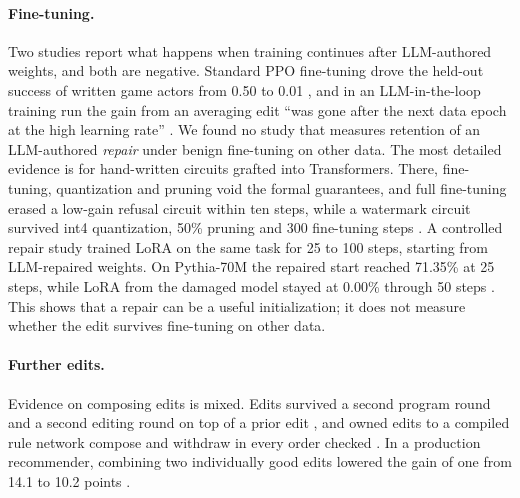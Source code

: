 \paragraph{Fine-tuning.} Two studies report what happens when training continues after LLM-authored weights, and both are negative. Standard PPO fine-tuning drove the held-out success of written game actors from 0.50 to 0.01 \citep{ax2611_16981}, and in an LLM-in-the-loop training run the gain from an averaging edit ``was gone after the next data epoch at the high learning rate'' \citep{ax2611_11005}. We found no study that measures retention of an LLM-authored \emph{repair} under benign fine-tuning on other data. The most detailed evidence is for hand-written circuits grafted into Transformers. There, fine-tuning, quantization and pruning void the formal guarantees, and full fine-tuning erased a low-gain refusal circuit within ten steps, while a watermark circuit survived int4 quantization, 50\% pruning and 300 fine-tuning steps \citep{zen23976715}. A controlled repair study trained LoRA on the same task for 25 to 100 steps, starting from LLM-repaired weights. On Pythia-70M the repaired start reached 71.35\% at 25 steps, while LoRA from the damaged model stayed at 0.00\% through 50 steps \citep{ax2611_25613}. This shows that a repair can be a useful initialization; it does not measure whether the edit survives fine-tuning on other data.

\paragraph{Further edits.} Evidence on composing edits is mixed. Edits survived a second program round \citep{ax2611_25476} and a second editing round on top of a prior edit \citep{ax2611_25257}, and owned edits to a compiled rule network compose and withdraw in every order checked \citep{ax2611_15917}. In a production recommender, combining two individually good edits lowered the gain of one from 14.1 to 10.2 points \citep{ax2611_29613}.

